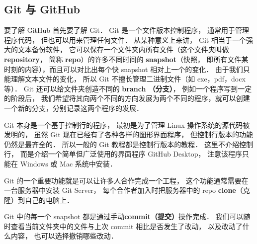 
\subsection{Git 与 GitHub}
要了解 GitHub 首先要了解 Git． Git 是一个文件版本控制程序， 通常用于管理程序代码， 但也可以用来管理任何文件． 从某种意义上来讲， Git 相当于一个强大的文本备份软件， 它可以保存一个文件夹内所有文件（这个文件夹叫做 \textbf{repository}， 简称 \textbf{repo}）的许多不同时间的 \textbf{snapshot}（快照， 即所有文件某时刻的内容），而且可以对比出每个快 snapshot 相对上一个的变化． 由于我们只能理解文本文件的变化， 所以 Git 不擅长管理二进制文件（如 exe，pdf，docx 等）． Git 还可以给文件夹创造不同的 \textbf{branch （分支）}， 例如一个程序写到一定的阶段后， 我们希望将其向两个不同的方向发展为两个不同的程序，就可以创建一个新的分支，分别记录这两个程序的发展．

Git 本身是一个基于控制行的程序， 最初是为了管理 Linux 操作系统的源代码被发明的， 虽然 Git 现在已经有了各种各样的图形界面程序， 但控制行版本的功能仍然是最齐全的． 所以一般的 Git 教程都是控制行版本的教程． 这里不介绍控制行， 而是介绍一个简单但广泛使用的界面程序 GitHub Desktop， 注意该程序只能在 Windows 或 Mac 系统中安装．

Git 的一个重要功能就是可以让许多人合作完成一个工程， 这个功能通常需要在一台服务器中安装 Git Server， 每个合作者加入时把服务器中的 repo \textbf{clone}（克隆）到自己的电脑上．

Git 中的每一个 snapshot 都是通过手动\textbf{commit（提交）}操作完成． 我们可以随时查看当前文件夹中的文件与上次 commit 相比是否发生了改动， 以及改动了什么内容， 也可以选择撤销哪些改动．
 
